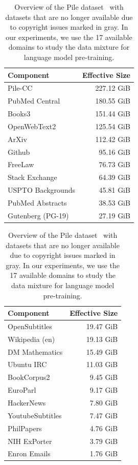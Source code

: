 \documentclass{article}
\theoremstyle{definition}
\theoremstyle{remark}
\begin{document}
\begin{table}[tb]
\centering
\small
\caption{Overview of the Pile dataset~\citep{the_pile_corpus} with datasets that are no longer available due to copyright issues marked in gray. In our experiments, we use the 17 available domains to study the data mixture for language model pre-training.}
\vspace{1mm}
\label{table:pile_overview}
\begin{tabular}{lr}
\toprule
\textbf{Component} & \textbf{Effective Size} \\
\midrule
Pile-CC  & 227.12 GiB  \\
PubMed Central & 180.55 GiB \\
\rowcolor{gray!25} Books3 & 151.44 GiB \\
\rowcolor{gray!25} OpenWebText2 & 125.54 GiB\\
ArXiv & 112.42 GiB \\
Github & 95.16 GiB\\
FreeLaw & 76.73 GiB \\
Stack Exchange & 64.39 GiB \\
USPTO Backgrounds & 45.81 GiB \\
PubMed Abstracts & 38.53 GiB \\
Gutenberg (PG-19) & 27.19 GiB \\
\bottomrule
\end{tabular}
\hspace{5mm}
\begin{tabular}{lr}
\toprule
\textbf{Component} & \textbf{Effective Size} \\
\midrule
\rowcolor{gray!25} OpenSubtitles & 19.47 GiB \\
Wikipedia (en) & 19.13 GiB \\
DM Mathematics  & 15.49 GiB \\
Ubuntu IRC & 11.03 GiB \\
\rowcolor{gray!25} BookCorpus2 & 9.45 GiB \\
EuroParl & 9.17 GiB \\
HackerNews & 7.80 GiB \\
\rowcolor{gray!25} YoutubeSubtitles & 7.47 GiB \\
PhilPapers & 4.76 GiB  \\
NIH ExPorter & 3.79 GiB  \\
Enron Emails & 1.76 GiB \\
\bottomrule
\end{tabular}
\vspace{-4mm}
\end{table}
\end{document}
